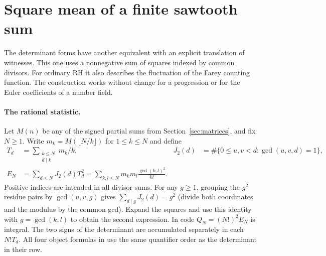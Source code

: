 \section{Square mean of a finite sawtooth sum}\label{sec:energy}
The determinant forms have another equivalent with an explicit translation of witnesses. This one uses a nonnegative sum of squares indexed by common divisors. For ordinary RH it also describes the fluctuation of the Farey counting function. The construction works without change for a progression or for the Euler coefficients of a number field.

\paragraph{The rational statistic.}
Let $M(n)$ be any of the signed partial sums from Section~\ref{sec:matrices}, and fix $N\ge1$. Write $m_k=M(\lfloor N/k\rfloor)$ for $1\le k\le N$ and define
\begin{align*}
 T_d&=\sum_{\substack{k\le N\\d\mid k}}m_k/k, &
 J_2(d)&=\#\{0\le u,v<d:\gcd(u,v,d)=1\},\\
 E_N&=\sum_{d\le N} J_2(d)T_d^2
     =\sum_{k,l\le N}m_k m_l\frac{\gcd(k,l)^2}{kl}.
\end{align*}
Positive indices are intended in all divisor sums. For any $g\ge1$, grouping the $g^2$ residue pairs by $\gcd(u,v,g)$ gives $\sum_{d\mid g}J_2(d)=g^2$ (divide both coordinates and the modulus by the common gcd). Expand the squares and use this identity with $g=\gcd(k,l)$ to obtain the second expression. In code $Q_N=(N!)^2 E_N$ is integral. The two signs of the determinant are accumulated separately in each $N!T_d$. All four object formulas in  use the same quantifier order as the determinant in their row.

